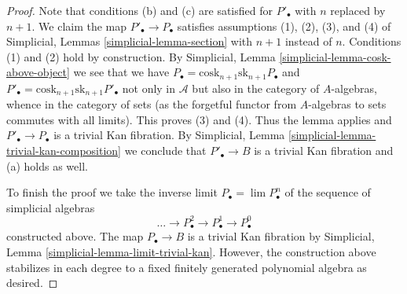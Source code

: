 \begin{proof}
\medskip\noindent
Note that conditions (b) and (c) are satisfied for $P'_\bullet$ with $n$
replaced by $n + 1$. We claim the map $P'_\bullet \to P_\bullet$ satisfies
assumptions (1), (2), (3), and (4) of
Simplicial, Lemmas \ref{simplicial-lemma-section}
with $n + 1$ instead of $n$. Conditions (1) and (2) hold by construction.
By Simplicial, Lemma \ref{simplicial-lemma-cosk-above-object}
we see that we have
$P_\bullet = \text{cosk}_{n + 1}\text{sk}_{n + 1}P_\bullet$
and
$P'_\bullet = \text{cosk}_{n + 1}\text{sk}_{n + 1}P'_\bullet$
not only in $\mathcal{A}$ but also in the category of $A$-algebras,
whence in the category of sets (as the forgetful functor from $A$-algebras
to sets commutes with all limits). This proves (3) and (4). Thus the lemma
applies and $P'_\bullet \to P_\bullet$ is a trivial Kan fibration. By
Simplicial, Lemma \ref{simplicial-lemma-trivial-kan-composition}
we conclude that $P'_\bullet \to B$ is a trivial Kan fibration and (a)
holds as well.

\medskip\noindent
To finish the proof we take the inverse limit $P_\bullet = \lim P^n_\bullet$
of the sequence of simplicial algebras
$$
\ldots \to P^2_\bullet \to P^1_\bullet \to P^0_\bullet
$$
constructed above. The map $P_\bullet \to B$ is a trivial Kan fibration by
Simplicial, Lemma \ref{simplicial-lemma-limit-trivial-kan}.
However, the construction above stabilizes in each degree
to a fixed finitely generated polynomial algebra as desired.
\end{proof}